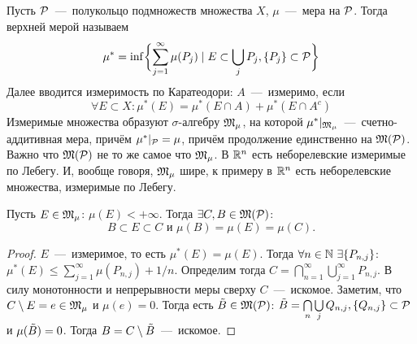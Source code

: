 \begin{reminder}
    Пусть $\mathcal{P}$~---~полукольцо подмножеств множества $X$, $\mu$~---~мера на $\mathcal{P}$. Тогда верхней мерой называем \[\mu^* = \inf \biggl\{\sum\limits_{j = 1}^\infty \mu(P_j) \mid E \subset \bigcup\limits_j P_j, \{P_j\} \subset \mathcal{P}\biggr\}\]
    Далее вводится измеримость по Каратеодори: $A$~---~измеримо, если \[\forall E \subset X: \mu^*(E) = \mu^*(E \cap A) + \mu^*(E \cap A^c)\]
    Измеримые множества образуют $\sigma$-алгебру $\mathfrak{M}_{\mu}$, на которой $\mu^* |_{\mathfrak{M}_{\mu}}$~---~счетно-аддитивная мера, причём $\mu^*|_{\mathcal{P}} = \mu$, причём продолжение единственно на $\mathfrak{M}(\mathcal{P})$. Важно что $\mathfrak{M}(\mathcal{P})$ не то же самое что  $\mathfrak{M}_{\mu}$. В $\mathbb{R}^n$ есть неборелевские измеримые по Лебегу. И, вообще говоря, $\mathfrak{M}_{\mu}$ шире, к примеру в $\mathbb{R}^n$ есть неборелевские множества, измеримые по Лебегу.
\end{reminder}
\begin{lemma}
    Пусть $E \in \mathfrak{M}_\mu$: $\mu (E) < +\infty$. Тогда $\exists C, B \in \mathfrak{M}(\mathcal{P})$: $$B \subset E \subset C \text{  и  } \mu(B) = \mu(E) = \mu(C).$$
\end{lemma}
\begin{proof}
    $E$~---~измеримое, то есть $\mu^*(E) = \mu(E)$.
    Тогда $\forall n \in \mathbb{N} \ \exists \{P_{n, j}\}$: $\mu^*(E) \leq \sum\limits_{j = 1}^\infty \mu(P_{n, j}) + 1/n$. Определим тогда $C = \bigcap\limits_{n = 1}^\infty\bigcup\limits_{j = 1}^\infty P_{n, j}$. В силу монотонности и непрерывности меры сверху $C$~---~искомое. Заметим, что $C \setminus E = e \in \mathfrak{M}_\mu$ и $\mu(e) = 0$. Тогда есть $\Tilde{B} \in \mathfrak{M}(\mathcal{P})$: $\Tilde{B} = \bigcap\limits_n\bigcup\limits_j Q_{n, j}, \{Q_{n, j}\} \subset \mathcal{P}$ и $\mu(\Tilde{B}) = 0$. Тогда $B = C \setminus \Tilde{B}$~---~искомое.
\end{proof}
